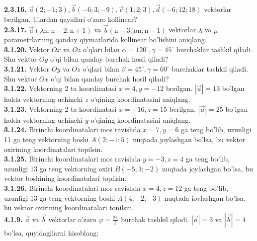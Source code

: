 \documentclass[10pt]{article}
\begin{document}
\textbf{2.3.16.} $\vec{a}(2 ;-1 ; 3), \vec{b}(-6 ; 3 ;-9), \vec{c}(1 ; 2 ; 3), \vec{d}(-6 ; 12 ; 18)$ vektorlar berilgan. Ulardan qaysilari o'zaro kollinear?\\
\textbf{2.3.17.} $\vec{a}(\lambda \mathrm{n} ; \mathrm{n}-2 ; \mathrm{n}+1)$ va $\vec{b}(\mathrm{n}-3 ; \mu \mathrm{n} ; \mathrm{n}-1)$ vektorlar $\lambda$ va $\mu$ parametrlarning qanday qiymatlarida kollinear bo'lishini aniqlang.\\
\textbf{3.1.20.} Vektor $O x$ va $O z$ o'qlari bilan $\alpha=120^{\circ}, \gamma=45^{\circ}$ burchaklar tashkil qiladi. Shu vektor $O y$ o'qi bilan qanday burchak hosil qiladi?\\
\textbf{3.1.21.} Vektor $O y$ va $O z$ o'qlari bilan $\beta=45^{\circ}, \gamma=60^{\circ}$ burchaklar tashkil qiladi. Shu vektor $O x$ o'qi bilan qanday burchak hosil qiladi?\\
\textbf{3.1.22.} Vektorning 2 ta koordinatasi $x=4, y=-12$ berilgan. $|\vec{a}|=13$ bo'lgan holda vektorning uchinchi $z$ o'qining koordinatasini aniqlang.\\
\textbf{3.1.23.} Vektorning 2 ta koordinatasi $x=-16, z=15$ berilgan. $|\vec{a}|=25$ bo'lgan holda vektorning uchinchi $y$ o'qining koordinatasini aniqlang.\\
\textbf{3.1.24.} Birinchi koordinatalari mos ravishda $x=7, y=6$ ga teng bo'lib, uzunligi 11 ga teng vektorning boshi $A(2 ;-1 ; 5)$ nuqtada joylashgan bo'lsa, bu vektor oxirining koordinatalari topilsin.\\
\textbf{3.1.25.} Birinchi koordinatalari mos ravishda $y=-3, z=4$ ga teng bo'lib, uzunligi 13 ga teng vektorning oxiri $B(-5 ; 3 ;-2)$ nuqtada joylashgan bo'lsa, bu vektor boshining koordinatalari topilsin.\\
\textbf{3.1.26.} Birinchi koordinatalari mos ravishda $x=4, z=12$ ga teng bo'lib, uzunligi 13 ga teng vektorning boshi $A(4 ;-2 ;-3)$ nuqtada iovlashgan bo'lsa. hu vektor oxirining koordinatalari tonilsin.\\
\textbf{4.1.9.} $\vec{a}$ va $\vec{b}$ vektorlar o'zaro $\varphi=\frac{2 \pi}{3}$ burchak tashkil qiladi. $|\vec{a}|=3$ va $|\vec{b}|=4$ bo'lsa, quyidagilarni hisoblang:
\end{document}
